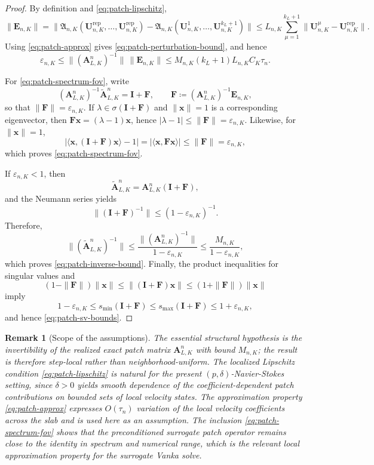 \documentclass[DIV=16]{scrartcl}
\newtheorem{remark}[theorem]{Remark}
\newcommand{\reg}{\delta}
\newcommand{\pn}{p}
\begin{document}
\begin{proof}
By definition and \eqref{eq:patch-lipschitz},
\[
  \|\bm E_{n,K}\|
  =
  \|\mathfrak A_{n,K}(\bm U_{n,K}^{\mathrm{rep}},\dots,\bm U_{n,K}^{\mathrm{rep}})
   -\mathfrak A_{n,K}(\bm U_{n,K}^{1},\dots,\bm U_{n,K}^{k_L+1})\|
  \le
  L_{n,K}\sum_{\mu=1}^{k_L+1}
  \|\bm U_{n,K}^\mu-\bm U_{n,K}^{\mathrm{rep}}\|.
\]
Using \eqref{eq:patch-approx} gives \eqref{eq:patch-perturbation-bound}, and
hence
\[
  \varepsilon_{n,K}
  \le \|(\bm A_{L,K}^n)^{-1}\|\,\|\bm E_{n,K}\|
  \le M_{n,K}(k_L+1)L_{n,K}C_K\tau_n.
\]

For \eqref{eq:patch-spectrum-fov}, write
\[
  (\bm A_{L,K}^n)^{-1}\tilde{\bm A}_{L,K}^n
  = \bm I+\bm F,
  \qquad
  \bm F\coloneq (\bm A_{L,K}^n)^{-1}\bm E_{n,K},
\]
so that \(\|\bm F\|=\varepsilon_{n,K}\). If
\(\lambda\in \sigma(\bm I+\bm F)\) and \(\|\bm x\|=1\) is a corresponding
eigenvector, then \(\bm F\bm x=(\lambda-1)\bm x\), hence
\(|\lambda-1|\le \|\bm F\|=\varepsilon_{n,K}\). Likewise, for
\(\|\bm x\|=1\),
\[
  |\langle \bm x,(\bm I+\bm F)\bm x\rangle-1|
  = |\langle \bm x,\bm F\bm x\rangle|
  \le \|\bm F\|
  = \varepsilon_{n,K},
\]
which proves \eqref{eq:patch-spectrum-fov}.

If \(\varepsilon_{n,K}<1\), then
\[
  \tilde{\bm A}_{L,K}^n
  = \bm A_{L,K}^n(\bm I+\bm F),
\]
and the Neumann series yields
\[
  \|(\bm I+\bm F)^{-1}\|\le (1-\varepsilon_{n,K})^{-1}.
\]
Therefore,
\[
  \|(\tilde{\bm A}_{L,K}^n)^{-1}\|
  \le
  \frac{\|(\bm A_{L,K}^n)^{-1}\|}{1-\varepsilon_{n,K}}
  \le
  \frac{M_{n,K}}{1-\varepsilon_{n,K}},
\]
which proves \eqref{eq:patch-inverse-bound}. Finally, the product inequalities
for singular values and
\[
  (1-\|\bm F\|)\|\bm x\|
  \le \|(\bm I+\bm F)\bm x\|
  \le (1+\|\bm F\|)\|\bm x\|
\]
imply
\[
  1-\varepsilon_{n,K}\le s_{\min}(\bm I+\bm F)
  \le s_{\max}(\bm I+\bm F)\le 1+\varepsilon_{n,K},
\]
and hence \eqref{eq:patch-sv-bounds}.
\end{proof}

\begin{remark}[Scope of the assumptions]
\label{rem:patch-surrogate}
The essential structural hypothesis is the invertibility of the realized exact
patch matrix \(\bm A_{L,K}^n\) with bound \(M_{n,K}\); the result is therefore
step-local rather than neighborhood-uniform. The localized Lipschitz condition
\eqref{eq:patch-lipschitz} is natural for the present
\((\pn,\reg)\)-Navier-Stokes setting, since \(\reg>0\) yields smooth dependence
of the coefficient-dependent patch contributions on bounded sets of local
velocity states. The approximation property \eqref{eq:patch-approx} expresses
\(O(\tau_n)\) variation of the local velocity coefficients across the slab and
is used here as an assumption. The inclusion \eqref{eq:patch-spectrum-fov} shows
that the preconditioned surrogate patch operator remains close to the identity
in spectrum and numerical range, which is the relevant local approximation
property for the surrogate Vanka solve.
\end{remark}




\end{document}
